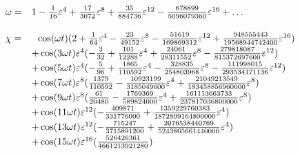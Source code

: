 \begin{equation}
\label{res-newvdp}
\begin{array}{ll}

\omega =& 1
-{\mathstrut 1 \over \mathstrut  16} \varepsilon^4
+{\mathstrut 17 \over \mathstrut  3072} \varepsilon^8
+{\mathstrut 35 \over \mathstrut  884736} \varepsilon^{12}
-{\mathstrut 678899 \over \mathstrut  5096079360} 
\varepsilon^{16} + \ldots\\

&\\


\chi = &\ \ \cos(\omega t) (2
+{\mathstrut 1 \over \mathstrut  64} \varepsilon^4
-{\mathstrut 23 \over \mathstrut  49152} \varepsilon^8
-{\mathstrut 51619 \over \mathstrut  169869312} \varepsilon^{12}
+{\mathstrut 948555443 \over \mathstrut  19568944742400} 
\varepsilon^{16})\\
&+\cos(3\omega t) \varepsilon^4 (
-{\mathstrut 3 \over \mathstrut  32}
+{\mathstrut 101 \over \mathstrut  12288} \varepsilon^4
+{\mathstrut 24061 \over \mathstrut  28311552} \varepsilon^8
-{\mathstrut 279818087 \over \mathstrut  815372697600} 
\varepsilon^{12})\\
&+\cos(5\omega t) \varepsilon^4 (
-{\mathstrut 5 \over \mathstrut  96}
+{\mathstrut 1865 \over \mathstrut  110592} \varepsilon^4
-{\mathstrut 328835 \over \mathstrut  254803968} \varepsilon^8
-{\mathstrut 111998015 \over \mathstrut  293534171136} 
\varepsilon^{12})\\
&+\cos(7\omega t) \varepsilon^8 ({\mathstrut 1379 \over \mathstrut  110592}
-{\mathstrut 10923199 \over \mathstrut  3185049600} \varepsilon^4
+{\mathstrut 21049213549 \over \mathstrut  183458856960000} \varepsilon^8)\\
&+\cos(9\omega t) \varepsilon^8 ({\mathstrut 61 \over \mathstrut  20480}
-{\mathstrut 1769369 \over \mathstrut  589824000} \varepsilon^4
+{\mathstrut 161113663733 \over \mathstrut  237817036800000} \varepsilon^8)\\
&+\cos(11\omega t) \varepsilon^{12} (
-{\mathstrut 409871 \over \mathstrut  331776000}
+{\mathstrut 1359229760383 \over \mathstrut  1872809164800000} \varepsilon^4)\\
&+\cos(13\omega t) \varepsilon^{12} (
-{\mathstrut 715247 \over \mathstrut  3715891200}
+{\mathstrut 2076538440769 \over \mathstrut  5243865661440000} \varepsilon^4)\\
&+\cos(15\omega t) \varepsilon^{16} 
({\mathstrut 526426361 \over \mathstrut  4661213921280})\\

\end{array}
\end{equation}

